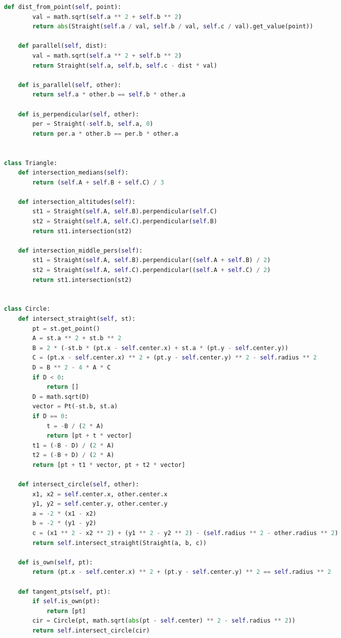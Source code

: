 \documentclass[10pt,a4paper,landscape,twosided]{extarticle}
\begin{document}
\begin{multicols*}{3}
\begin{lstlisting}[language=Python]
    def dist_from_point(self, point):
        val = math.sqrt(self.a ** 2 + self.b ** 2)
        return abs(Straight(self.a / val, self.b / val, self.c / val).get_value(point))

    def parallel(self, dist):
        val = math.sqrt(self.a ** 2 + self.b ** 2)
        return Straight(self.a, self.b, self.c - dist * val)

    def is_parallel(self, other):
        return self.a * other.b == self.b * other.a

    def is_perpendicular(self, other):
        per = Straight(-self.b, self.a, 0)
        return per.a * other.b == per.b * other.a


class Triangle:
    def intersection_medians(self):
        return (self.A + self.B + self.C) / 3

    def intersection_altitudes(self):
        st1 = Straight(self.A, self.B).perpendicular(self.C)
        st2 = Straight(self.A, self.C).perpendicular(self.B)
        return st1.intersection(st2)

    def intersection_middle_pers(self):
        st1 = Straight(self.A, self.B).perpendicular((self.A + self.B) / 2)
        st2 = Straight(self.A, self.C).perpendicular((self.A + self.C) / 2)
        return st1.intersection(st2)


class Circle:
    def intersect_straight(self, st):
        pt = st.get_point()
        A = st.a ** 2 + st.b ** 2
        B = 2 * (-st.b * (pt.x - self.center.x) + st.a * (pt.y - self.center.y))
        C = (pt.x - self.center.x) ** 2 + (pt.y - self.center.y) ** 2 - self.radius ** 2
        D = B ** 2 - 4 * A * C
        if D < 0:
            return []
        D = math.sqrt(D)
        vector = Pt(-st.b, st.a)
        if D == 0:
            t = -B / (2 * A)
            return [pt + t * vector]
        t1 = (-B - D) / (2 * A)
        t2 = (-B + D) / (2 * A)
        return [pt + t1 * vector, pt + t2 * vector]

    def intersect_circle(self, other):
        x1, x2 = self.center.x, other.center.x
        y1, y2 = self.center.y, other.center.y
        a = -2 * (x1 - x2)
        b = -2 * (y1 - y2)
        c = (x1 ** 2 - x2 ** 2) + (y1 ** 2 - y2 ** 2) - (self.radius ** 2 - other.radius ** 2)
        return self.intersect_straight(Straight(a, b, c))

    def is_own(self, pt):
        return (pt.x - self.center.x) ** 2 + (pt.y - self.center.y) ** 2 == self.radius ** 2

    def tangent_pts(self, pt):
        if self.is_own(pt):
            return [pt]
        cir = Circle(pt, math.sqrt(abs(pt - self.center) ** 2 - self.radius ** 2))
        return self.intersect_circle(cir)


\end{lstlisting}
\end{multicols*}
\end{document}

